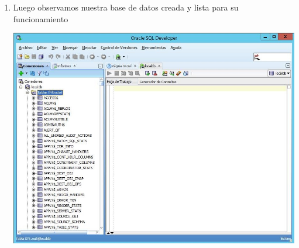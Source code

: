 \begin{enumerate}[1.]
	\item Luego observamos nuestra base de datos creada y lista para su funcionamiento\\
	\begin{center}
	\includegraphics[width=15cm]{./Imagenes/img28} 
	\end{center}


\end{enumerate} 
